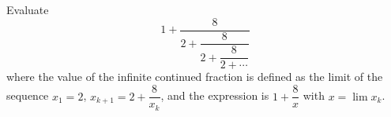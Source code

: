 Evaluate
\[
1+\dfrac{8}{2+\dfrac{8}{2+\dfrac{8}{2+\cdots}}}
\]
where the value of the infinite continued fraction is defined as the limit of the sequence $x_1=2$, $x_{k+1}=2+\dfrac{8}{x_k}$, and the expression is $1+\dfrac{8}{x}$ with $x=\lim x_k$.
